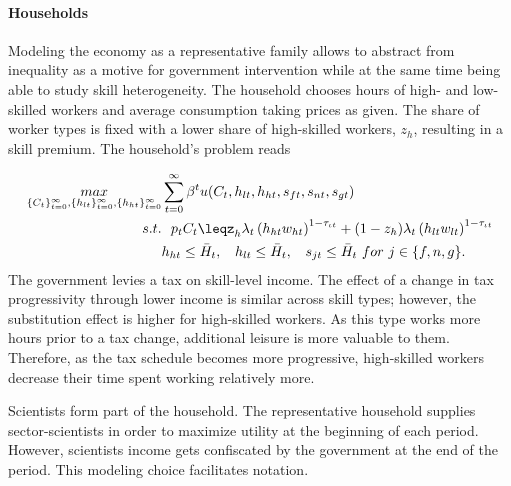 \paragraph{Households}
Modeling the economy as a representative family allows to abstract from inequality as a motive for government intervention while at the same time being able to study skill heterogeneity.
 The household chooses hours of high- and low-skilled workers and average consumption taking prices as given. The share of worker types is fixed with a lower share of high-skilled workers, $z_h$, resulting in a skill premium. The household's problem reads

\begin{align}
\underset{\{C_{t}\}_{t=0}^{\infty}, \{h_{lt}\}_{t=0}^{\infty}, \{h_{ht}\}_{t=0}^{\infty}}{max}&
\sum_{t=0}^{\infty}\beta^t u(C_{t}, h_{lt}, h_{ht}, s_{ft}, s_{nt}, s_{gt})\\
s.t.& \ \ p_{t}C_{t}\leq%
z_h\lambda_t \left(h_{ht}w_{ht}\right)^{1-\tau_{\iota t}}+(1-z_h)\lambda_t\left(h_{lt}w_{lt}\right)^{1-\tau_{\iota t}}\\ %
\ & h_{ht}\leq \bar{H}_t,\ \hspace{2mm} h_{lt}\leq \bar{H}_t,\ \hspace{2mm}  s_{jt}\leq \bar{H}_t \ for\ j\in\{f,n,g\}.
\end{align}
The government levies a tax on skill-level income. 
The effect of a change in tax progressivity through lower income is similar across skill types; however, the substitution effect is higher for high-skilled workers. As this type works more hours prior to a tax change, additional leisure is more valuable to them. Therefore, as the tax schedule becomes more progressive, high-skilled workers decrease their time spent working relatively more.


Scientists form part of the household. The representative household supplies sector-scientists in order to maximize utility at the beginning of each period. However, scientists income gets confiscated by the government at the end of the period. This modeling choice facilitates notation. 

